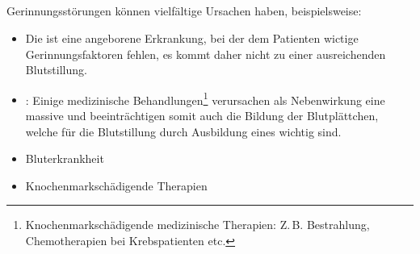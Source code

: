 \subsection{}


\TextSlide{\TxBeschreibung}
{%
Gerinnungsstörungen können vielfältige Ursachen haben, 
beispielsweise:
\begin{itemize}
  \item Die  ist eine angeborene Erkrankung, 
  bei der dem Patienten wictige Gerinnungsfaktoren fehlen, 
  es kommt daher nicht zu einer ausreichenden Blutstillung. 
  \item  {}:
  Einige medizinische Behandlungen\footnote{Knochenmarkschädigende medizinische Therapien: 
  Z.\,B. Bestrahlung, 
  Chemotherapien bei Krebspatienten etc.} 
  verursachen als Nebenwirkung eine massive 
  und beeinträchtigen somit auch die Bildung der Blutplättchen, 
  welche für die Blutstillung durch Ausbildung eines  wichtig sind.
\end{itemize}
}
{%
\begin{itemize}
  \item Bluterkrankheit
  \item Knochenmarkschädigende Therapien
\end{itemize}
}




\nocite{Eisenburger2008,
Havel2007,
AMLS3,
Erc2005DeSec5,
Erc2005Sec5,
Erc2005DeSec6,
Erc2005DeSec3,
Erc2005Sec3,
Juurlink2005,
Kalla2006,
Vlcek2008,
Wells2000,
BoehmerTaschRett6,
LPN3,
Boecker2,
Helfen2008,
LippertAnatomie7,
Patzelt2005,
Sachsenweger2003,
RedelsteinerHRNS1,
ForMed2,
StriebelAn7,
Zeiler2001,
KlinkePhysio3,
DRAn3,
ForthPharma8,
LuellmannPharma16,
ThierbachInterhospitaltransfer1,
AnCompact3,
RueckerBildatlas1}

% 
% 


\ChapterBibliography 


\ChapterEnd